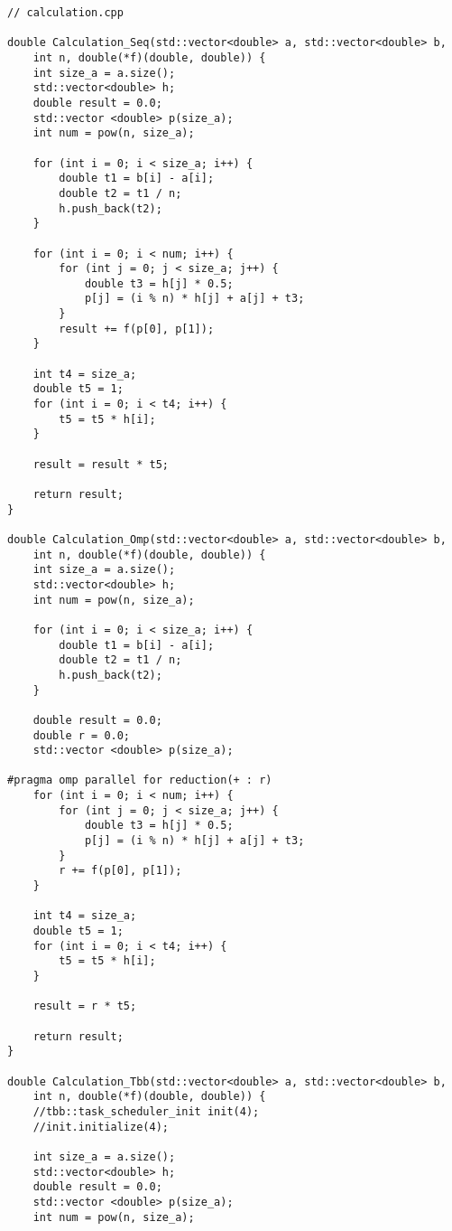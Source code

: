 \documentclass{report}
\begin{document}
\begin{lstlisting}
// calculation.cpp

double Calculation_Seq(std::vector<double> a, std::vector<double> b,
    int n, double(*f)(double, double)) {
    int size_a = a.size();
    std::vector<double> h;
    double result = 0.0;
    std::vector <double> p(size_a);
    int num = pow(n, size_a);

    for (int i = 0; i < size_a; i++) {
        double t1 = b[i] - a[i];
        double t2 = t1 / n;
        h.push_back(t2);
    }

    for (int i = 0; i < num; i++) {
        for (int j = 0; j < size_a; j++) {
            double t3 = h[j] * 0.5;
            p[j] = (i % n) * h[j] + a[j] + t3;
        }
        result += f(p[0], p[1]);
    }

    int t4 = size_a;
    double t5 = 1;
    for (int i = 0; i < t4; i++) {
        t5 = t5 * h[i];
    }

    result = result * t5;

    return result;
}

double Calculation_Omp(std::vector<double> a, std::vector<double> b,
    int n, double(*f)(double, double)) {
    int size_a = a.size();
    std::vector<double> h;
    int num = pow(n, size_a);

    for (int i = 0; i < size_a; i++) {
        double t1 = b[i] - a[i];
        double t2 = t1 / n;
        h.push_back(t2);
    }

    double result = 0.0;
    double r = 0.0;
    std::vector <double> p(size_a);

#pragma omp parallel for reduction(+ : r)
    for (int i = 0; i < num; i++) {
        for (int j = 0; j < size_a; j++) {
            double t3 = h[j] * 0.5;
            p[j] = (i % n) * h[j] + a[j] + t3;
        }
        r += f(p[0], p[1]);
    }

    int t4 = size_a;
    double t5 = 1;
    for (int i = 0; i < t4; i++) {
        t5 = t5 * h[i];
    }

    result = r * t5;

    return result;
}

double Calculation_Tbb(std::vector<double> a, std::vector<double> b,
    int n, double(*f)(double, double)) {
    //tbb::task_scheduler_init init(4);
    //init.initialize(4);

    int size_a = a.size();
    std::vector<double> h;
    double result = 0.0;
    std::vector <double> p(size_a);
    int num = pow(n, size_a);


\end{lstlisting}
\end{document}
